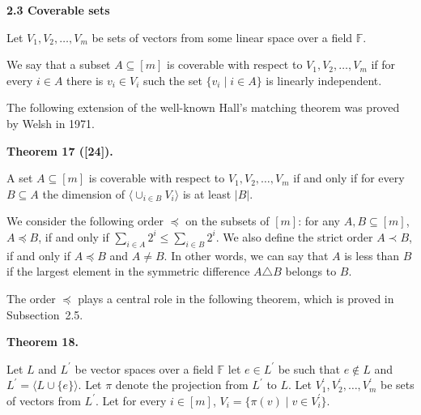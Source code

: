 \par\medskip\noindent\textbf{
2.3 Coverable sets}\par


Let $V_{1},V_{2},\dots,V_{m}$ be sets of vectors from some linear space over a field $\mathbb{F}$.\par



We say that a subset $A\subseteq[m]$ is coverable with respect to $V_{1},V_{2},\dots,V_{m}$ if for every $i\in A$ there is $v_{i}\in V_{i}$ such the set $\{v_{i}\mid i\in A\}$ is linearly independent.\par



The following extension of the well-known Hall’s matching theorem was proved by Welsh in 1971.\par



\par\medskip\noindent\textbf{
Theorem 17 ([24]).
}\par



A set $A\subseteq[m]$ is coverable with respect to $V_{1},V_{2},\dots,V_{m}$ if and only if for every $B\subseteq A$ the dimension of $\langle\cup_{i\in B}V_{i}\rangle$ is at least $|B|$.\par




We consider the following order $\preceq$ on the subsets of $[m]$: for any $A,B\subseteq[m]$, $A\preceq B$, if and only if $\sum_{i\in A}2^{i}\leq\sum_{i\in B}2^{i}$. We also define the strict order $A\prec B$, if and only if $A\preceq B$ and $A\neq B$. In other words, we can say that $A$ is less than $B$ if the largest element in the symmetric difference $A\triangle B$ belongs to $B$.\par



The order $\preceq$ plays a central role in the following theorem, which is proved in Subsection 2.5.\par



\par\medskip\noindent\textbf{
Theorem 18.
}\par



Let $L$ and $L^{\prime}$ be vector spaces over a field $\mathbb{F}$ let $e\in L^{\prime}$ be such that $e\notin L$ and $L^{\prime}=\langle L\cup\{e\}\rangle$. Let
$\pi$ denote the projection from $L^{\prime}$ to $L$. Let $V^{\prime}_{1},V^{\prime}_{2},\dots,V^{\prime}_{m}$ be sets of vectors from $L^{\prime}$.
Let for every $i\in[m]$, $V_{i}=\{\pi(v)\mid v\in V_{i}^{\prime}\}$.\par




